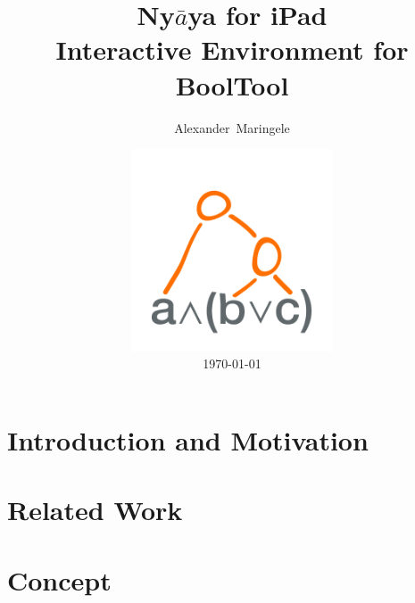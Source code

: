 \documentclass{clbthesis}
\begin{document}
\nocite{*}

\title{Ny$\bar{a}$ya for iPad\vspace{0.5cm}\\ \LARGE{Interactive Environment for BoolTool}}
\author{Alexander~Maringele}
\date{\includegraphics[width=6cm]{pics/NyayaAppIcon1024.png}\\ \today}


\maketitle

\abstract{}

\tableofcontents
\chapter{Introduction and Motivation} 			


\chapter{Related Work}						


\chapter{Concept}							

\end{document}

